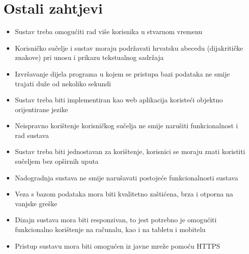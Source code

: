 \section{Ostali zahtjevi}
\begin{itemize}
	\item Sustav treba omogućiti rad više korisnika u stvarnom vremenu
	\item Korisničko sučelje i sustav moraju podržavati hrvatsku abecedu (dijakritičke znakove) pri unosu i prikazu tekstualnog sadržaja
	\item Izvršavanje dijela programa u kojem se pristupa bazi podataka ne smije trajati duže od nekoliko sekundi
	\item Sustav treba biti implementiran kao web aplikacija koristeći objektno orijentirane jezike
	\item Neispravno korištenje korisničkog sučelja ne smije narušiti funkcionalnost i rad sustava
	\item Sustav treba biti jednostavan za korištenje, korisnici se moraju znati koristiti sučeljem bez opširnih uputa
	\item Nadogradnja sustava ne smije narušavati postojeće funkcionalnosti sustava
	\item Veza s bazom podataka mora biti kvalitetno zaštićena, brza i otporna na vanjske greške 
	\item Dizajn sustava mora biti responzivan, to jest potrebno je omogućiti funkcionalno korištenje na računalu, kao i na tabletu i mobitelu
	\item Pristup sustavu mora biti omogućen iz javne mreže pomoću HTTPS
\end{itemize}